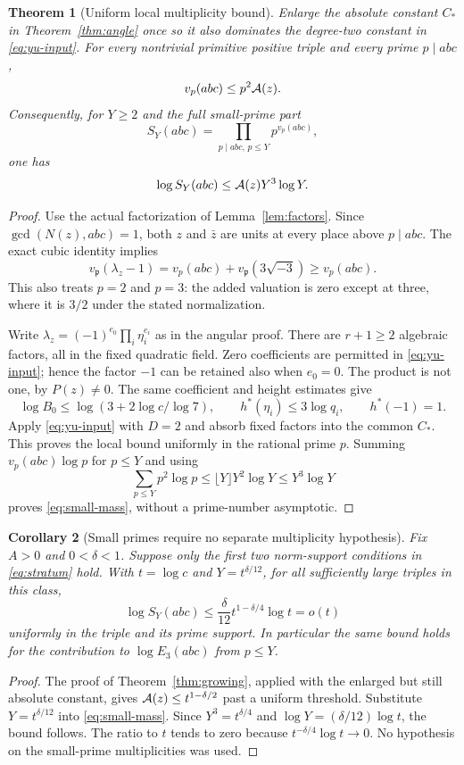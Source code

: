 \documentclass[11pt]{amsart}
\newtheorem{theorem}{Theorem}[section]
\newtheorem{corollary}[theorem]{Corollary}
\theoremstyle{definition}\newtheorem{definition}[theorem]{Definition}
\theoremstyle{remark}\newtheorem{remark}[theorem]{Remark}
\begin{document}
\begin{theorem}[Uniform local multiplicity bound]\label{thm:adic-local}
Enlarge the absolute constant $C_*$ in Theorem~\ref{thm:angle} once so it also dominates the degree-two constant in \eqref{eq:yu-input}. For every nontrivial primitive positive triple and every prime $p\mid abc$,
\[
 v_p(abc)\le p^2\mathcal A(z).
\]
Consequently, for $Y\ge2$ and the full small-prime part
\[
 S_Y(abc)=\prod_{p\mid abc,\,p\le Y}p^{v_p(abc)},
\]
one has
\begin{equation}\label{eq:small-mass}
 \log S_Y(abc)\le \mathcal A(z)Y^3\log Y.
\end{equation}
\end{theorem}
\begin{proof}
Use the actual factorization of Lemma~\ref{lem:factors}. Since $\gcd(N(z),abc)=1$, both $z$ and $\bar z$ are units at every place above $p\mid abc$. The exact cubic identity implies
\[
 v_{\mathfrak p}(\lambda_z-1)
  =v_p(abc)+v_{\mathfrak p}(3\sqrt{-3})
  \ge v_p(abc).
\]
This also treats $p=2$ and $p=3$: the added valuation is zero except at three, where it is $3/2$ under the stated normalization.

Write $\lambda_z=(-1)^{e_0}\prod_i\eta_i^{e_i}$ as in the angular proof. There are $r+1\ge2$ algebraic factors, all in the fixed quadratic field. Zero coefficients are permitted in \eqref{eq:yu-input}; hence the factor $-1$ can be retained also when $e_0=0$. The product is not one, by $P(z)\ne0$. The same coefficient and height estimates give
\[
 \log B_0\le\log(3+2\log c/\log7),\qquad
 h^*(\eta_i)\le3\log q_i,\qquad h^*(-1)=1.
\]
Apply \eqref{eq:yu-input} with $D=2$ and absorb fixed factors into the common $C_*$. This proves the local bound uniformly in the rational prime $p$. Summing $v_p(abc)\log p$ for $p\le Y$ and using
\[
 \sum_{p\le Y}p^2\log p\le \lfloor Y\rfloor Y^2\log Y\le Y^3\log Y
\]
proves \eqref{eq:small-mass}, without a prime-number asymptotic.
\end{proof}

\begin{corollary}[Small primes require no separate multiplicity hypothesis]\label{cor:small-free}
Fix $A>0$ and $0<\delta<1$. Suppose only the first two norm-support conditions in \eqref{eq:stratum} hold. With $t=\log c$ and $Y=t^{\delta/12}$, for all sufficiently large triples in this class,
\[
 \log S_Y(abc)\le \frac{\delta}{12}
            t^{1-\delta/4}\log t=o(t)
\]
uniformly in the triple and its prime support. In particular the same bound holds for the contribution to $\log E_3(abc)$ from $p\le Y$.
\end{corollary}
\begin{proof}
The proof of Theorem~\ref{thm:growing}, applied with the enlarged but still absolute constant, gives $\mathcal A(z)\le t^{1-\delta/2}$ past a uniform threshold. Substitute $Y=t^{\delta/12}$ into \eqref{eq:small-mass}. Since $Y^3=t^{\delta/4}$ and $\log Y=(\delta/12)\log t$, the bound follows. The ratio to $t$ tends to zero because $t^{-\delta/4}\log t\to0$. No hypothesis on the small-prime multiplicities was used.
\end{proof}
\end{document}
